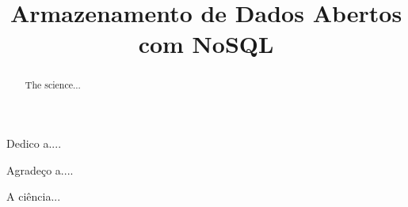 \documentclass[bacharelado]{unb-cic}
\title{Armazenamento de Dados Abertos com NoSQL}
\begin{document}
  \maketitle
  \pretextual

  \begin{dedicatoria}
  Dedico a....
  \end{dedicatoria}

  \begin{agradecimentos}
  Agradeço a....
  \end{agradecimentos}

  \begin{resumo}
  A ciência...
  \end{resumo}

  \begin{abstract}
  The science...
  \end{abstract}

  \tableofcontents
  \listoffigures
  \listoftables

  \textual
  

  \postextual
  
  
\end{document}
